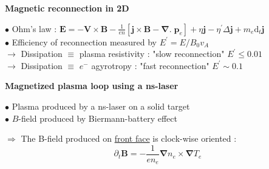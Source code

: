 \documentclass[landscape]{slides}
\newcommand{\D}{{\mathrm d}}
\begin{document}
\begin{slide}
{\large \textbf{Magnetic reconnection in 2D}}

\begin{center}

\end{center}

$\bullet$ Ohm's law : $\mathbf E = - \mathbf V \times \mathbf B - \frac{1}{en} [\mathbf j \times \mathbf B - \boldsymbol{\nabla} . \; \mathbf p_e] + \eta \mathbf j - \eta^{\prime} \Delta \mathbf j + m_e \D _t \mathbf j$ \\[0.4cm]
$\bullet$ Efficiency  of reconnection measured by $E^{\prime} = E/B_0 v_A$ \\[0.4cm]
$\to$ Dissipation $\equiv$ plasma resistivity : "slow reconnection" $E^{\prime} \le 0.01$\\
$\to$ Dissipation $\equiv$ $e^-$ agyrotropy : "fast reconnection" $E^{\prime} \sim 0.1$ \\

\end{slide}



\begin{slide}
{\large \textbf{Magnetized plasma loop using a ns-laser}}

$\bullet$ Plasma produced by a ns-laser on a solid target \\
$\bullet$ $B$-field produced by Biermann-battery effect

\begin{center}

\end{center}

$\Rightarrow$ The B-field produced on \underline{front face} is clock-wise oriented :
$$
\partial_t \mathbf B = - \frac{1}{en_e} \boldsymbol{\nabla} n_e \times \boldsymbol{\nabla} T_e
$$

\end{slide}
\end{document}
